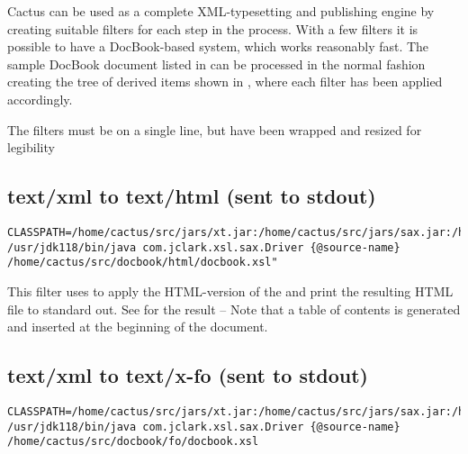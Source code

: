 
Cactus can be used as a complete XML-typesetting and publishing engine
by creating suitable filters for each step in the process.  With a few
filters it is possible to have a DocBook-based system, which works
reasonably fast.  The sample DocBook document listed in
 can be processed in the normal fashion
creating the tree of derived items shown in
, where each filter has been applied accordingly.


The filters must be on a single line, but have been wrapped and resized for legibility
\subsection*{text/xml to text/html (sent to stdout)}
{\footnotesize
\begin{verbatim}
CLASSPATH=/home/cactus/src/jars/xt.jar:/home/cactus/src/jars/sax.jar:/home/cactus/src/jars/xp.jar
/usr/jdk118/bin/java com.jclark.xsl.sax.Driver {@source-name} /home/cactus/src/docbook/html/docbook.xsl"
\end{verbatim}
}
This filter uses  to
apply the HTML-version of the
 and print the resulting HTML file to standard out.  See
 for the result --  Note that a table of
  contents is generated and inserted at the beginning of the document.  



\subsection*{text/xml to text/x-fo (sent to stdout)}
  {\footnotesize
\begin{verbatim}
CLASSPATH=/home/cactus/src/jars/xt.jar:/home/cactus/src/jars/sax.jar:/home/cactus/src/jars/xp.jar 
/usr/jdk118/bin/java com.jclark.xsl.sax.Driver {@source-name} /home/cactus/src/docbook/fo/docbook.xsl
\end{verbatim}
  }

